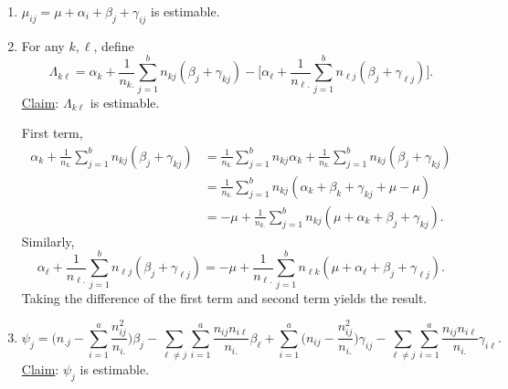 \begin{enumerate}[(1)]
    \item $ \mu_{ij}=\mu+\alpha_i+\beta_j+\gamma_{ij} $ is estimable.
    \item For any $ k,\ell $, define
          \[ \Lambda_{k\ell}=\alpha_k+\frac{1}{n_{k.}}\sum_{j=1}^{b}n_{kj}(\beta_j+\gamma_{kj})-
              \biggl[\alpha_{\ell}+\frac{1}{n_{\ell.}}\sum_{j=1}^{b}n_{\ell j}(\beta_j+\gamma_{\ell j})\biggr]. \]
          \underline{Claim}: $ \Lambda_{k\ell} $ is estimable.

          First term,
          \begin{align*}
              \alpha_k+\frac{1}{n_{k.}}\sum_{j=1}^{b}n_{kj}(\beta_j+\gamma_{kj})
               & =\frac{1}{n_{k.}}\sum_{j=1}^{b}n_{kj}\alpha_k+\frac{1}{n_{k.}}\sum_{j=1}^{b}n_{kj}(\beta_j+\gamma_{kj}) \\
               & =\frac{1}{n_{k.}}\sum_{j=1}^{b}n_{kj}(\alpha_k+\beta_k+\gamma_{kj}+\mu-\mu)                             \\
               & =-\mu+\frac{1}{n_{k.}}\sum_{j=1}^{b}n_{kj}(\mu+\alpha_k+\beta_j+\gamma_{kj}).
          \end{align*}
          Similarly,
          \[ \alpha_{\ell}+\frac{1}{n_{\ell.}}\sum_{j=1}^{b}n_{\ell j}(\beta_j+\gamma_{\ell j})
              =-\mu+\frac{1}{n_{\ell.}}\sum_{j=1}^{b}n_{\ell k}(\mu+\alpha_\ell+\beta_j+\gamma_{\ell j}).\]
          Taking the difference of the first term and second term yields the result.
    \item \[ \psi_j=\biggl(n_{.j}-\sum_{i=1}^{a}\frac{n_{ij}^2}{n_{i.}}\biggr)\beta_j
              -\sum_{\ell \ne j}\sum_{i=1}^{a}\frac{n_{ij}n_{i\ell}}{n_{i.}}\beta_\ell
              +\sum_{i=1}^{a}\biggl(n_{ij}-\frac{n_{ij}^2}{n_{i.}}\biggr)\gamma_{ij}
              -\sum_{\ell \ne j}\sum_{i=1}^{a}\frac{n_{ij}n_{i\ell}}{n_{i.}}\gamma_{i\ell}. \]
          \underline{Claim}: $ \psi_j $ is estimable.


\end{enumerate}
